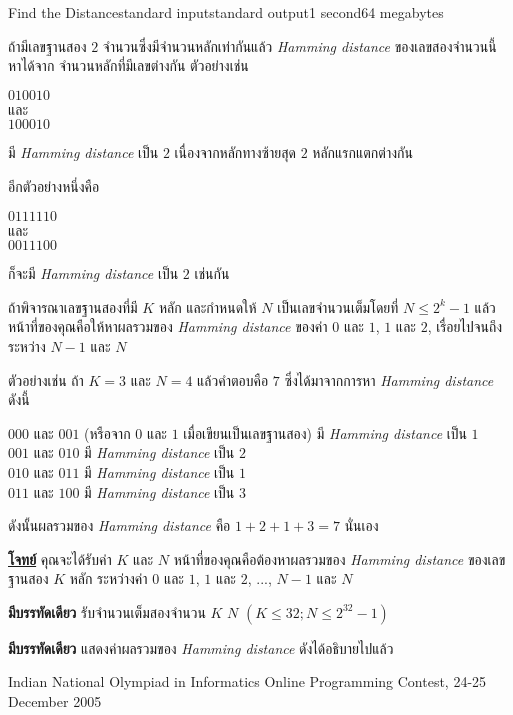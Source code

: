 \documentclass[11pt,a4paper]{article}
\begin{document}
\begin{problem}{Find the Distance}{standard input}{standard output}{1 second}{64 megabytes}

ถ้ามีเลขฐานสอง $2$ จำนวนซึ่งมีจำนวนหลักเท่ากันแล้ว \textit{Hamming distance} ของเลขสองจำนวนนี้ หาได้จาก จำนวนหลักที่มีเลขต่างกัน ตัวอย่างเช่น

$010010$\\
และ\\
$100010$

มี\textit{ Hamming distance} เป็น $2$ เนื่องจากหลักทางซ้ายสุด $2$ หลักแรกแตกต่างกัน 
\bigskip

อีกตัวอย่างหนึ่งคือ

$0111110$\\
และ\\
$0011100$

ก็จะมี \textit{Hamming distance} เป็น $2$ เช่นกัน

\bigskip
ถ้าพิจารณาเลขฐานสองที่มี $K$ หลัก และกำหนดให้ $N$ เป็นเลขจำนวนเต็มโดยที่ $N \leq 2^k-1$ แล้ว หน้าที่ของคุณคือให้หาผลรวมของ \textit{Hamming distance} ของค่า $0$ และ $1$, $1$ และ $2$, เรื่อยไปจนถึงระหว่าง $N-1$ และ $N$

ตัวอย่างเช่น ถ้า $K=3$ และ $N=4$ แล้วคำตอบคือ $7$ ซึ่งได้มาจากการหา \textit{Hamming distance} ดังนี้

$000$ และ $001$ (หรือจาก $0$ และ $1$ เมื่อเขียนเป็นเลขฐานสอง) มี \textit{Hamming distance} เป็น $1$\\
$001$ และ $010$ มี \textit{Hamming distance} เป็น $2$\\
$010$ และ $011$ มี \textit{Hamming distance} เป็น $1$\\
$011$ และ $100$ มี \textit{Hamming distance} เป็น $3$

ดังนั้นผลรวมของ \textit{Hamming distance} คือ $1+2+1+3 = 7$ นั่นเอง

\bigskip
\underline{\textbf{โจทย์}}  คุณจะได้รับค่า $K$ และ $N$ หน้าที่ของคุณคือต้องหาผลรวมของ\textit{ Hamming distance} ของเลขฐานสอง $K$ หลัก ระหว่างค่า $0$ และ $1$, $1$ และ $2$, $...$, $N-1$ และ $N$

\InputFile

\textbf{มีบรรทัดเดียว} รับจำนวนเต็มสองจำนวน $K$ $N$ $( K \leq 32; N \leq 2^{32}-1)$

\OutputFile

\textbf{มีบรรทัดเดียว} แสดงค่าผลรวมของ \textit{Hamming distance} ดังได้อธิบายไปแล้ว

\Examples

\begin{example}
%
\end{example}


\Source

Indian National Olympiad in Informatics
Online Programming Contest, 24-25 December 2005

\end{problem}
\end{document}
